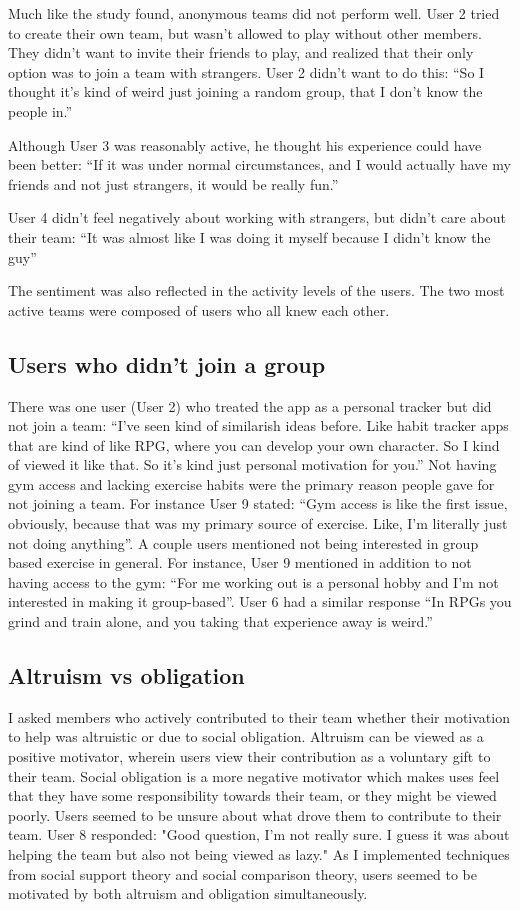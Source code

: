 \documentclass{l4proj}
\begin{document}
Much like the study \citet{Fish'n'Steps} found, anonymous teams did not perform well. User 2 tried to create their own team, but wasn't allowed to play without other members. They didn't want to invite their friends to play, and realized that their only option was to join a team with strangers. User 2 didn't want to do this: ``So I thought it's kind of weird just joining a random group, that I don't know the people in.'' 

Although User 3 was reasonably active, he thought his experience could have been better: ``If it was under normal circumstances, and I would actually have my friends and not just strangers, it would be really fun.'' 

User 4 didn't feel negatively about working with strangers, but didn't care about their team: ``It was almost like I was doing it myself because I didn't know the guy'' 

The sentiment was also reflected in the activity levels of the users. The two most active teams were composed of users who all knew each other.

\subsection{Users who didn't join a group}
There was one user (User 2) who treated the app as a personal tracker but did not join a team: ``I've seen kind of similarish ideas before. Like habit tracker apps that are kind of like RPG, where you can develop your own character. So I kind of viewed it like that. So it's kind just personal motivation for you.'' Not having gym access and lacking exercise habits were the primary reason people gave for not joining a team.  For instance User 9 stated: ``Gym access is like the first issue, obviously, because that was my primary source of exercise. Like, I'm literally just not doing anything''. A couple users mentioned not being interested in group based exercise in general. For instance, User 9 mentioned in addition to not having access to the gym: ``For me working out is a personal hobby and I'm not interested in making it group-based''. User 6 had a similar response ``In RPGs you grind and train alone, and you taking that experience away is weird.''

\subsection{Altruism vs obligation}
I asked members who actively contributed to their team whether their motivation to help was altruistic or due to social obligation. Altruism can be viewed as a positive motivator, wherein users view their contribution as a voluntary gift to their team. Social obligation is a more negative motivator which makes uses feel that they have some responsibility towards their team, or they might be viewed poorly. Users seemed to be unsure about what drove them to contribute to their team. User 8 responded: "Good question, I'm not really sure. I guess it was about helping the team but also not being viewed as lazy." As I implemented techniques from social support theory and social comparison theory, users seemed to be motivated by both altruism and obligation simultaneously.
\end{document}
